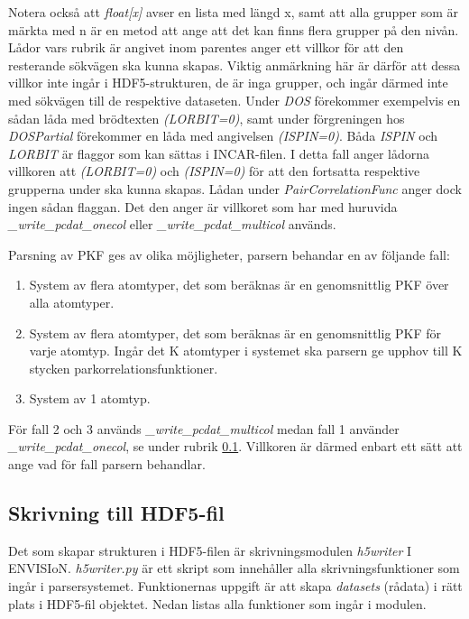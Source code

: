 Notera också att \textit{float[x]} avser en lista med längd x, samt att alla grupper som är märkta med n är en metod att ange att det kan finns flera grupper på den nivån. Lådor vars rubrik är angivet inom parentes anger ett villkor för att den resterande sökvägen ska kunna skapas. Viktig anmärkning här är därför att dessa villkor inte ingår i HDF5-strukturen, de är inga grupper, och ingår därmed inte med sökvägen till de respektive dataseten. Under \textit{\/DOS} förekommer exempelvis en sådan låda med brödtexten \textit{(LORBIT=0)}, samt under förgreningen hos \textit{\/DOS\/Partial} förekommer en låda med angivelsen \textit{(ISPIN=0)}. Båda \textit{ISPIN} och \textit{LORBIT} är flaggor som kan sättas i INCAR-filen. I detta fall anger lådorna villkoren att \textit{(LORBIT=0)} och \textit{(ISPIN=0)} för att den fortsatta respektive grupperna under ska kunna skapas. Lådan under \textit{\/PairCorrelationFunc} anger dock ingen sådan flaggan. Det den anger är villkoret som har med huruvida \textit{\_write\_pcdat\_onecol} eller \textit{\_write\_pcdat\_multicol} används.

Parsning av PKF ges av olika möjligheter, parsern behandar en av följande fall: 

\begin{enumerate}
    \item System av flera atomtyper, det som beräknas är en genomsnittlig PKF över alla atomtyper.  
    \item System av flera atomtyper, det som beräknas är en genomsnittlig PKF för varje atomtyp. Ingår det K atomtyper i systemet ska parsern ge upphov till K stycken parkorrelationsfunktioner.
    \item System av 1 atomtyp. 
\end{enumerate}

För fall 2 och 3 används \textit{\_write\_pcdat\_multicol} medan fall 1 använder \textit{\_write\_pcdat\_onecol}, se under rubrik \ref{ssec:skrivning till HDF5}. Villkoren är därmed enbart ett sätt att ange vad för fall parsern behandlar. 
\newpage 

\subsection{Skrivning till HDF5-fil} \label{ssec:skrivning till HDF5}
Det som skapar strukturen i HDF5-filen är skrivningsmodulen \textit{h5writer} I ENVISIoN. \textit{h5writer.py} är ett skript som innehåller alla skrivningsfunktioner som ingår i parsersystemet. Funktionernas uppgift är att skapa \textit{datasets} (rådata) i rätt plats i HDF5-fil objektet. Nedan listas alla funktioner som ingår i modulen.

